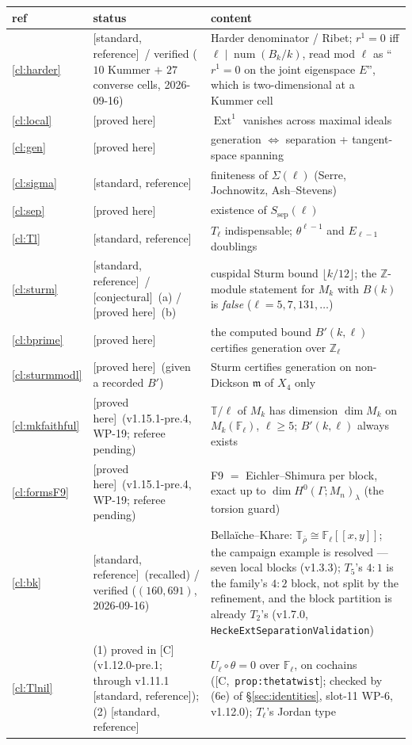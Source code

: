 \documentclass[11pt]{article}
\theoremstyle{remark}
\newcommand{\F}{\mathbb{F}}
\newcommand{\Z}{\mathbb{Z}}
\newcommand{\Ga}{\Gamma}
\newcommand{\Fl}{\F_\ell}
\DeclareMathOperator{\Ext}{Ext}
\DeclareMathOperator{\num}{num}
\newcommand{\T}{\mathbb{T}}
\newcommand{\m}{\mathfrak{m}}
\newcommand{\Mn}{M_n}
\newcommand{\HA}[1]{[C,~\texttt{#1}]}      %
\newcommand{\PROVED}{\textsf{[proved here]}}
\newcommand{\STD}{\textsf{[standard, reference]}}
\newcommand{\CONJ}{\textsf{[conjectural]}}
\begin{document}
\begin{center}\footnotesize
\begin{longtable}{@{}l>{\raggedright\arraybackslash}p{3.6cm}>{\raggedright\arraybackslash}p{10.6cm}@{}}
\toprule
ref & status & content \\
\midrule
\endhead
\ref{cl:harder} & \STD\ / verified ($10$ Kummer $+$ $27$ converse cells, 2026-09-16) & Harder denominator / Ribet; $r^1=0$ iff $\ell\mid\num(B_k/k)$, read mod $\ell$ as ``$r^1=0$ on the joint eigenspace $E$'', which is two-dimensional at a Kummer cell \\
\ref{cl:local} & \PROVED & $\Ext^1$ vanishes across maximal ideals \\
\ref{cl:gen} & \PROVED & generation $\Leftrightarrow$ separation + tangent-space spanning \\
\ref{cl:sigma} & \STD & finiteness of $\Sigma(\ell)$ (Serre, Jochnowitz, Ash--Stevens) \\
\ref{cl:sep} & \PROVED & existence of $S_{\mathrm{sep}}(\ell)$ \\
\ref{cl:Tl} & \STD & $T_\ell$ indispensable; $\theta^{\ell-1}$ and $E_{\ell-1}$ doublings \\
\ref{cl:sturm} & \STD\ / \CONJ\ (a) / \PROVED\ (b) & cuspidal Sturm bound $\lfloor k/12\rfloor$; the $\Z$-module statement for $M_k$ with $B(k)$ is \emph{false} ($\ell=5,7,131,\dots$) \\
\ref{cl:bprime} & \PROVED & the computed bound $B'(k,\ell)$ certifies generation over $\Z_\ell$ \\
\ref{cl:sturmmodl} & \PROVED\ (given a recorded $B'$) & Sturm certifies generation on non-Dickson $\m$ of $X_4$ only \\
\ref{cl:mkfaithful} & \PROVED\ (v1.15.1-pre.4, WP-19; referee pending) & $\T/\ell$ of $M_k$ has dimension $\dim M_k$ on $M_k(\Fl)$, $\ell\ge5$; $B'(k,\ell)$ always exists \\
\ref{cl:formsF9} & \PROVED\ (v1.15.1-pre.4, WP-19; referee pending) & F9 $=$ Eichler--Shimura per block, exact up to $\dim H^0(\Ga;\Mn)_\lambda$ (the torsion guard) \\
\ref{cl:bk} & \STD\ (recalled) / verified ($(160,691)$, 2026-09-16) & Bella\"iche--Khare: $\T_{\bar\rho}\cong\Fl[[x,y]]$; the campaign example is resolved --- seven local blocks (v1.3.3); $T_5$'s $4{:}1$ is the family's $4{:}2$ block, not split by the refinement, and the block partition is already $T_2$'s (v1.7.0, \texttt{HeckeExtSeparationValidation}) \\
\ref{cl:Tlnil} & (1) proved in [C] (v1.12.0-pre.1; through v1.11.1 \STD); (2) \STD & $U_\ell\circ\theta=0$ over $\Fl$, on cochains (\HA{prop:thetatwist}; checked by (6e) of \S\ref{sec:identities}, slot-11 WP-6, v1.12.0); $T_\ell$'s Jordan type \\

\end{longtable}
\end{center}
\end{document}
